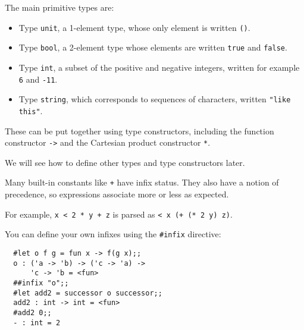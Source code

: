 \begin{slide*}


\vspace*{0.5cm}

The main primitive types are:

\begin{itemize}

\item Type {\black \tt unit}, a 1-element type, whose only element is written
{\black \tt ()}.

\item Type {\black \tt bool}, a 2-element type whose elements are written
{\black \tt true} and {\black \tt false}.

\item Type {\black \tt int}, a subset of the positive and negative integers,
written for example {\black \tt 6} and {\black \tt -11}.

\item Type {\black \tt string}, which corresponds to sequences of characters,
written {\black \tt "like this"}.

\end{itemize}

These can be put together using type constructors, including the function
constructor {\black \verb+->+} and the Cartesian product constructor {\black \verb+*+}.

We will see how to define other types and type constructors later.

\end{slide*}



\begin{slide*}


\vspace*{0.5cm}

Many built-in constants like {\black \tt +} have infix status. They also have a notion
of precedence, so expressions associate more or less as expected.

For example, {\black \tt x < 2 * y + z} is parsed as {\black \tt < x (+ (* 2 y)
z)}.

You can define your own infixes using the {\black \verb+#infix+} directive:

\begin{black}\begin{verbatim}
  #let o f g = fun x -> f(g x);;
  o : ('a -> 'b) -> ('c -> 'a) ->
      'c -> 'b = <fun>
  ##infix "o";;
  #let add2 = successor o successor;;
  add2 : int -> int = <fun>
  #add2 0;;
  - : int = 2
\end{verbatim}\end{black}

\end{slide*}


